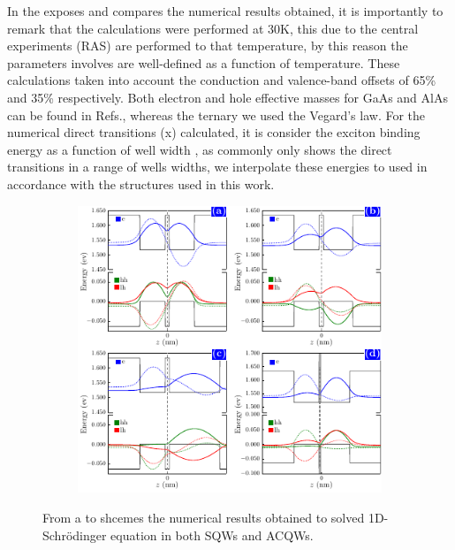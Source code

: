 In the  exposes and compares the numerical results obtained, it is importantly to remark that the calculations were performed at 30K, this due to the central experiments (RAS) are performed to that temperature, by this reason the parameters involves are well-defined as a function of temperature. These calculations taken into account the conduction and valence-band offsets of 65\% and 35\% respectively. Both electron and hole effective masses for GaAs and AlAs can be found in Refs.\cite{vurgaftman2001bandparameters,molenk1988determination,adachi2009properties}, whereas the ternary \algaas we used the Vegard's law\cite{donmez2012study}. For the numerical direct transitions (\gls{x}) calculated, it is consider the exciton binding energy as a function of well width \cite{yutaka1994theeffect,greene1984energylevels}, as commonly  only shows the direct transitions in a range of wells widths, we interpolate these energies to  used in accordance with the structures used in  this work. 

\begin{figure}[ht!]
	\centering
	\begin{subfigure}{\textwidth}
	\includegraphics[width=\textwidth]{../figures/chapter-2/numerical-calculations/build-ruco/numerical-results}
	\label{subfig:chapter-2-sec-numerical-results-a}
	\label{subfig:chapter-2-sec-numerical-results-b}
	\label{subfig:chapter-2-sec-numerical-results-c}
	\label{subfig:chapter-2-sec-numerical-results-d}
	\end{subfigure}
	\caption{From  a to  shcemes the numerical results obtained to solved 1D-Schrödinger equation in both SQWs and ACQWs. }
	\label{fig:chapter-2-sec-numerical-calculations-results}
\end{figure} 

